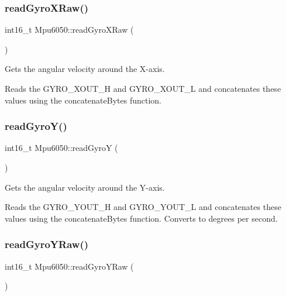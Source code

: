 \subsubsection{\texorpdfstring{read\+Gyro\+X\+Raw()}{readGyroXRaw()}}
{\footnotesize\ttfamily int16\+\_\+t Mpu6050\+::read\+Gyro\+X\+Raw (\begin{DoxyParamCaption}{ }\end{DoxyParamCaption})\hspace{0.3cm}{\ttfamily [virtual]}}



Gets the angular velocity around the X-\/axis. 

Reads the G\+Y\+R\+O\+\_\+\+X\+O\+U\+T\+\_\+H and G\+Y\+R\+O\+\_\+\+X\+O\+U\+T\+\_\+L and concatenates these values using the concatenate\+Bytes function. \mbox{\label{classMpu6050_a32291036eb3c88455bc8054d5014d99c}} 
\subsubsection{\texorpdfstring{read\+Gyro\+Y()}{readGyroY()}}
{\footnotesize\ttfamily int16\+\_\+t Mpu6050\+::read\+GyroY (\begin{DoxyParamCaption}{ }\end{DoxyParamCaption})\hspace{0.3cm}{\ttfamily [virtual]}}



Gets the angular velocity around the Y-\/axis. 

Reads the G\+Y\+R\+O\+\_\+\+Y\+O\+U\+T\+\_\+H and G\+Y\+R\+O\+\_\+\+Y\+O\+U\+T\+\_\+L and concatenates these values using the concatenate\+Bytes function. Converts to degrees per second. \mbox{\label{classMpu6050_a080b7bea5ae0c8e839ee763aabb8a31c}} 
\subsubsection{\texorpdfstring{read\+Gyro\+Y\+Raw()}{readGyroYRaw()}}
{\footnotesize\ttfamily int16\+\_\+t Mpu6050\+::read\+Gyro\+Y\+Raw (\begin{DoxyParamCaption}{ }\end{DoxyParamCaption})\hspace{0.3cm}{\ttfamily [virtual]}}



